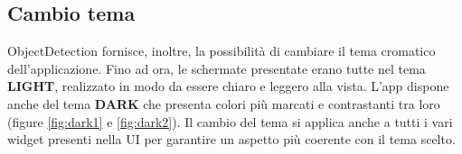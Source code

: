 \subsection{Cambio tema}
ObjectDetection fornisce, inoltre, la possibilità di cambiare il tema cromatico dell’applicazione. Fino ad ora, le schermate presentate erano tutte nel
tema \textbf{LIGHT}, realizzato in modo da essere chiaro e leggero alla vista. L’app dispone anche del tema \textbf{DARK} che presenta colori più marcati e contrastanti tra
loro (figure \ref{fig:dark1} e \ref{fig:dark2}).
Il cambio del tema si applica anche a tutti i vari widget presenti nella UI per garantire un aspetto più coerente con il tema scelto.

\begin{figure}[ht]
  \centering
  \begin{subfigure}[b]{0.3\textwidth}

\end{subfigure}
\end{figure}
